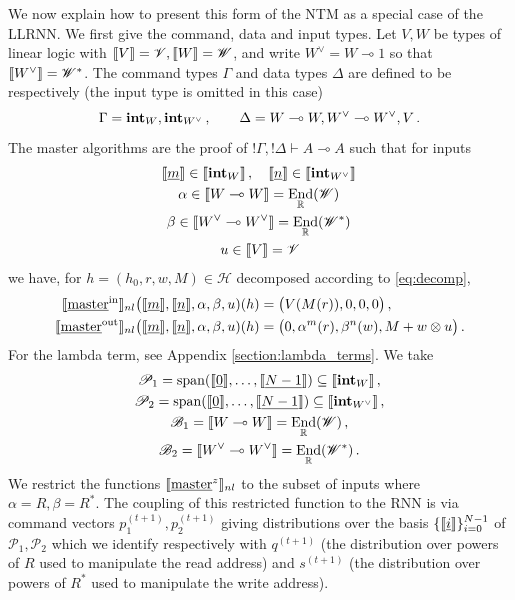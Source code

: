 \documentclass[english,letter paper,12pt,leqno]{article}
\theoremstyle{example}
\numberwithin{equation}{section}
\DeclareMathOperator{\End}{End}
\begin{document}
We now explain how to present this form of the NTM as a special case of the LLRNN. We first give the command, data and input types. Let $V,W$ be types of linear logic with $\llbracket V \rrbracket = \mathscr{V}, \llbracket W \rrbracket = \mathscr{W}$, and write $W^{\vee} = W \multimap 1$ so that $\llbracket W^{\vee} \rrbracket = \mathscr{W}^*$. The command types $\Gamma$ and data types $\Delta$ are defined to be respectively (the input type is omitted in this case)
\[
\Gamma = \textbf{int}_W, \textbf{int}_{W^{\vee}}\,, \qquad \Delta = W \multimap W, W^{\vee} \multimap W^{\vee}, V\,.
\]
The master algorithms are the proof of ${!} \Gamma, {!} \Delta \vdash A \multimap A$ such that for inputs
\begin{gather*}
\den{\underline{m}} \in \den{\inta_W}\,,\quad \den{\underline{n}} \in \den{\inta_{W^{\vee}}}\,\\
\alpha \in \den{ W \multimap W} = \End_{\mathbb{R}}(\mathscr{W})\,\\
\beta \in \den{ W^{\vee} \multimap W^{\vee}} = \End_{\mathbb{R}}(\mathscr{W}^*)\,\\
u \in \den{V} = \mathscr{V}
\end{gather*}
we have, for $h = (h_0,r,w,M) \in \mathscr{H}$ decomposed according to \eqref{eq:decomp},
\begin{align*}
\llbracket \underline{\textup{master}}^{\mathrm{in}} \rrbracket_{nl}\big( \llbracket \underline{m} \rrbracket, \llbracket \underline{n} \rrbracket, \alpha, \beta, u )(h) &= \big( V(M(r)), 0, 0, 0 \big)\,,\\
\llbracket \underline{\textup{master}}^{\mathrm{out}} \rrbracket_{nl}\big( \llbracket \underline{m} \rrbracket, \llbracket \underline{n} \rrbracket, \alpha, \beta, u )(h) &= \big( 0, \alpha^m(r), \beta^n(w), M + w \otimes u\big)\,.
\end{align*}
For the lambda term, see Appendix \ref{section:lambda_terms}. We take
\begin{gather*}
\mathscr{P}_1 = \operatorname{span}(\den{\underline{0}}, \ldots, \den{\underline{N-1}}) \subseteq \den{\inta_W}\,,\\
\mathscr{P}_2 = \operatorname{span}(\den{\underline{0}}, \ldots, \den{\underline{N-1}}) \subseteq \den{\inta_{W^{\vee}}}\,,\\
\mathscr{B}_1 = \den{ W \multimap W} = \End_{\mathbb{R}}(\mathscr{W})\,,\\
\mathscr{B}_2 = \den{ W^{\vee} \multimap W^{\vee}} = \End_{\mathbb{R}}(\mathscr{W}^*)\,.
\end{gather*}
We restrict the functions $\llbracket \underline{\textup{master}}^z \rrbracket_{nl}$ to the subset of inputs where $\alpha = R, \beta = R^*$. The coupling of this restricted function to the RNN is via command vectors $p_1^{(t+1)}, p_2^{(t+1)}$ giving distributions over the basis $\{ \llbracket \underline{i} \rrbracket \}_{i=0}^{N-1}$ of $\mathscr{P}_1,\mathscr{P}_2$ which we identify respectively with $q^{(t+1)}$ (the distribution over powers of $R$ used to manipulate the read address) and $s^{(t+1)}$ (the distribution over powers of $R^*$ used to manipulate the write address).
\end{document}
